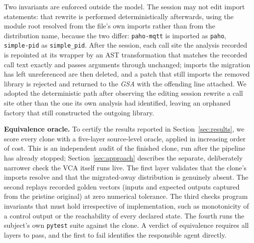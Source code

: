 Two invariants are enforced outside the model. The session may not edit import statements: that rewrite is performed deterministically afterwards, using the module root resolved from the file's own imports rather than from the distribution name, because the two differ: \texttt{paho-mqtt} is imported as \texttt{paho}, \texttt{simple-pid} as \texttt{simple\_pid}. After the session, each call site the analysis recorded is repointed at its wrapper by an AST transformation that matches the recorded call text exactly and passes arguments through unchanged; imports the migration has left unreferenced are then deleted, and a patch that still imports the removed library is rejected and returned to the \emph{GSA} with the offending line attached. We adopted the deterministic path after observing the editing session rewrite a call site other than the one its own analysis had identified, leaving an orphaned factory that still constructed the outgoing library.

\textbf{Equivalence oracle.}
To certify the results reported in Section~\ref{sec:results}, we score every clone with a five-layer source-level oracle, applied in increasing order of cost. This is an independent audit of the finished clone, run after the pipeline has already stopped; Section~\ref{sec:approach} describes the separate, deliberately narrower check the VCA itself runs live. The first layer validates that the clone's imports resolve and that the migrated-away distribution is genuinely absent. The second replays recorded golden vectors (inputs and expected outputs captured from the pristine original) at zero numerical tolerance. The third checks program invariants that must hold irrespective of implementation, such as monotonicity of a control output or the reachability of every declared state. The fourth runs the subject's own \texttt{pytest} suite against the clone. A verdict of equivalence requires all layers to pass, and the first to fail identifies the responsible agent directly.

